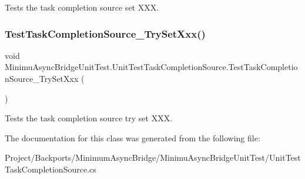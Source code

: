 Tests the task completion source set X\+XX. 

\mbox{\label{class_minimu_async_bridge_unit_test_1_1_unit_test_task_completion_source_ab9b0c4fd85ed08adcae235ddae7a6a92}} 
\subsubsection{\texorpdfstring{Test\+Task\+Completion\+Source\+\_\+\+Try\+Set\+Xxx()}{TestTaskCompletionSource\_TrySetXxx()}}
{\footnotesize\ttfamily void Minimu\+Async\+Bridge\+Unit\+Test.\+Unit\+Test\+Task\+Completion\+Source.\+Test\+Task\+Completion\+Source\+\_\+\+Try\+Set\+Xxx (\begin{DoxyParamCaption}{ }\end{DoxyParamCaption})\hspace{0.3cm}{\ttfamily [inline]}}



Tests the task completion source try set X\+XX. 



The documentation for this class was generated from the following file\+:\begin{DoxyCompactItemize}
\item 
Project/\+Backports/\+Minimum\+Async\+Bridge/\+Minimu\+Async\+Bridge\+Unit\+Test/Unit\+Test\+Task\+Completion\+Source.\+cs\end{DoxyCompactItemize}
